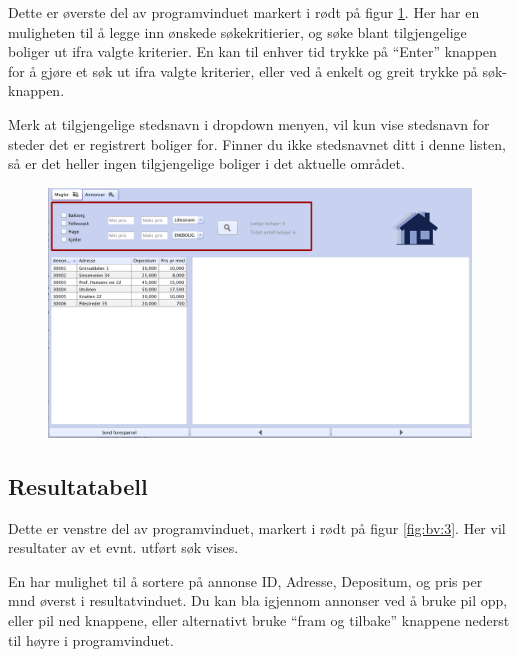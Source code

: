 Dette er øverste del av programvinduet markert i rødt på figur \ref{fig:bv:2}. Her har en muligheten til å
legge inn ønskede søkekritierier, og søke blant tilgjengelige boliger ut ifra valgte kriterier.
En kan til enhver tid trykke på “Enter” knappen for å gjøre et søk ut ifra valgte kriterier, eller ved å
enkelt og greit trykke på søk-knappen.

Merk at tilgjengelige stedsnavn i dropdown menyen, vil kun vise stedsnavn for steder det er
registrert boliger for. Finner du ikke stedsnavnet ditt i denne listen, så er det heller ingen
tilgjengelige boliger i det aktuelle området.



\begin{figure}[h!]
 \includegraphics[width=\textwidth,height=\textheight,keepaspectratio]{./img/brukerveiledning/2.png}
 \caption{}
 \label{fig:bv:2}
\end{figure}




\newpage
\subsection{Resultatabell}
Dette er venstre del av programvinduet, markert i rødt på figur \ref{fig:bv:3}.
Her vil resultater av et evnt. utført søk vises.

En har mulighet til å sortere på annonse ID, Adresse, Depositum, og pris per mnd øverst i
resultatvinduet. Du kan bla igjennom annonser ved å bruke pil opp, eller pil ned knappene, eller
alternativt bruke “fram og tilbake” knappene nederst til høyre i programvinduet.


